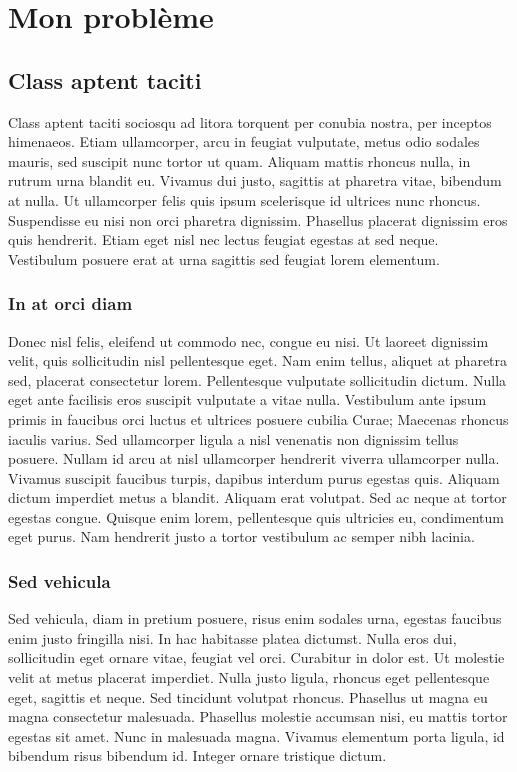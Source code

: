\chapter{Mon problème}\minitoc

\section{Class aptent taciti}

 Class aptent taciti sociosqu ad litora torquent per conubia nostra, per inceptos himenaeos. Etiam ullamcorper, arcu in feugiat vulputate, metus odio sodales mauris, sed suscipit nunc tortor ut quam. Aliquam mattis rhoncus nulla, in rutrum urna blandit eu. Vivamus dui justo, sagittis at pharetra vitae, bibendum at nulla. Ut ullamcorper felis quis ipsum scelerisque id ultrices nunc rhoncus. Suspendisse eu nisi non orci pharetra dignissim. Phasellus placerat dignissim eros quis hendrerit. Etiam eget nisl nec lectus feugiat egestas at sed neque. Vestibulum posuere erat at urna sagittis sed feugiat lorem elementum.


\subsection{In at orci diam}

Donec nisl felis, eleifend ut commodo nec, congue eu nisi. Ut laoreet dignissim velit, quis sollicitudin nisl pellentesque eget. Nam enim tellus, aliquet at pharetra sed, placerat consectetur lorem. Pellentesque vulputate sollicitudin dictum. Nulla eget ante facilisis eros suscipit vulputate a vitae nulla. Vestibulum ante ipsum primis in faucibus orci luctus et ultrices posuere cubilia Curae; Maecenas rhoncus iaculis varius. Sed ullamcorper ligula a nisl venenatis non dignissim tellus posuere. Nullam id arcu at nisl ullamcorper hendrerit viverra ullamcorper nulla. Vivamus suscipit faucibus turpis, dapibus interdum purus egestas quis. Aliquam dictum imperdiet metus a blandit. Aliquam erat volutpat. Sed ac neque at tortor egestas congue. Quisque enim lorem, pellentesque quis ultricies eu, condimentum eget purus. Nam hendrerit justo a tortor vestibulum ac semper nibh lacinia. 

\subsection{Sed vehicula}

Sed vehicula, diam in pretium posuere, risus enim sodales urna, egestas faucibus enim justo fringilla nisi. In hac habitasse platea dictumst. Nulla eros dui, sollicitudin eget ornare vitae, feugiat vel orci. Curabitur in dolor est. Ut molestie velit at metus placerat imperdiet. Nulla justo ligula, rhoncus eget pellentesque eget, sagittis et neque. Sed tincidunt volutpat rhoncus. Phasellus ut magna eu magna consectetur malesuada. Phasellus molestie accumsan nisi, eu mattis tortor egestas sit amet. Nunc in malesuada magna. Vivamus elementum porta ligula, id bibendum risus bibendum id. Integer ornare tristique dictum. 

